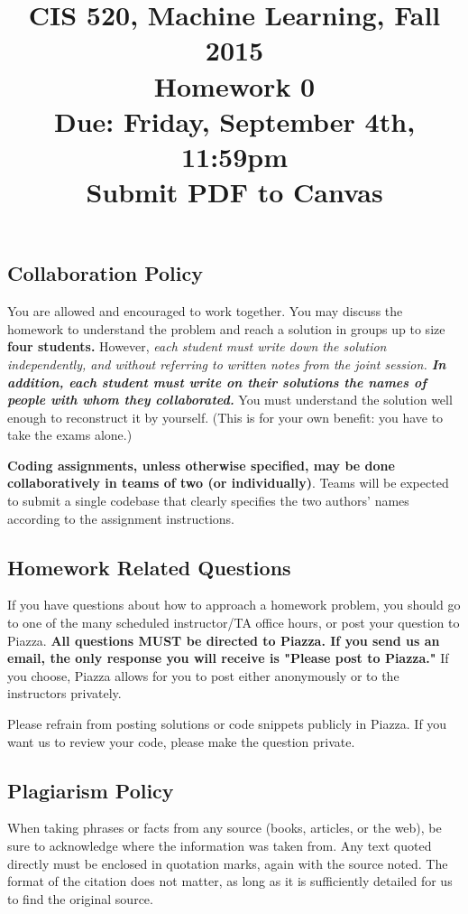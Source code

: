 \documentclass[english]{article}
\title{CIS 520, Machine Learning, Fall 2015 \\ Homework 0\\
Due: Friday, September 4th, 11:59pm \\ Submit PDF to Canvas}
\date{}
\begin{document}
\maketitle
\vspace{-30pt}
\subsection*{Collaboration Policy} 

You are allowed and encouraged to work together. You may discuss the
homework to understand the problem and reach a solution in groups up
to size {\bf four students.} However, {\em each student must write
  down the solution independently, and without referring to written
  notes from the joint session. {\bf In addition, each student must
    write on their solutions the names of people with whom they
    collaborated.}} You must understand the solution well enough 
to reconstruct it by yourself. (This is for your own benefit:
you have to take the exams alone.)

{\bf Coding assignments, unless otherwise specified, may be done
  collaboratively in teams of two (or individually)}. Teams will be
expected to submit a single codebase that clearly specifies the two
authors' names according to the assignment instructions.

\subsection*{Homework Related Questions}
If you have questions about how to approach a homework problem, you
should go to one of the many scheduled instructor/TA office hours, or post your question to Piazza. {\bf All questions MUST be directed to Piazza. If you send us an email, the only response you will receive is "Please post to Piazza." } If you choose, Piazza allows for you to post either anonymously or to the instructors privately.

Please refrain from posting solutions or code snippets publicly in Piazza. If you want us to review your code, please make the question private.

\subsection*{Plagiarism Policy}
When taking phrases or facts from any source (books,
articles, or the web), be sure to acknowledge where the information
was taken from.  Any text quoted directly must be enclosed in
quotation marks, again with the source noted.  The format of the
citation does not matter, as long as it is sufficiently detailed for
us to find the original source.
\end{document}
